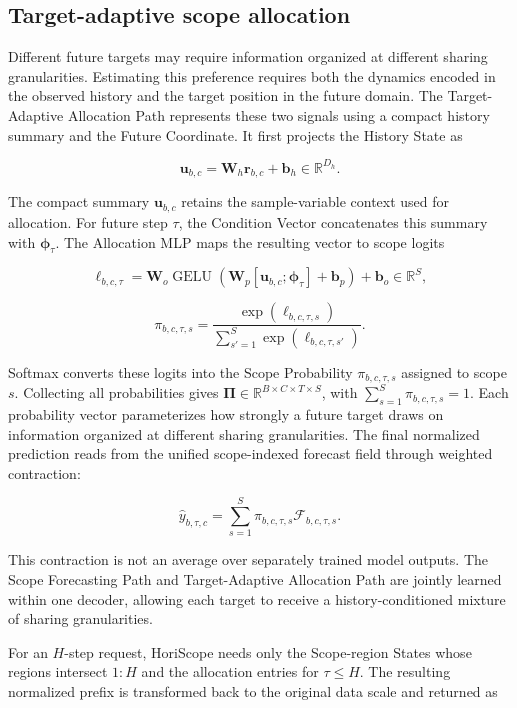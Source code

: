 \documentclass[final,3p,times]{elsarticle}
\begin{document}
\subsection{Target-adaptive scope allocation}


Different future targets may require information organized at different sharing granularities. Estimating this preference requires both the dynamics encoded in the observed history and the target position in the future domain. The Target-Adaptive Allocation Path represents these two signals using a compact history summary and the Future Coordinate. It first projects the History State as

\[
\mathbf u_{b,c}
=
\mathbf W_h\mathbf r_{b,c}
+
\mathbf b_h
\in\mathbb R^{D_h}.
\]


The compact summary $\mathbf u_{b,c}$ retains the sample-variable context used for allocation. For future step $\tau$, the Condition Vector concatenates this summary with $\boldsymbol\phi_\tau$. The Allocation MLP maps the resulting vector to scope logits

\[
\boldsymbol\ell_{b,c,\tau}
=
\mathbf W_o
\operatorname{GELU}\!\left(
\mathbf W_p
[\mathbf u_{b,c};\boldsymbol\phi_\tau]
+
\mathbf b_p
\right)
+
\mathbf b_o
\in\mathbb R^S,
\]


\[
\pi_{b,c,\tau,s}
=
\frac{
\exp(\ell_{b,c,\tau,s})
}{
\sum_{s'=1}^{S}
\exp(\ell_{b,c,\tau,s'})
}.
\]


Softmax converts these logits into the Scope Probability $\pi_{b,c,\tau,s}$ assigned to scope $s$. Collecting all probabilities gives $\boldsymbol\Pi\in\mathbb R^{B\times C\times T\times S}$, with $\sum_{s=1}^{S}\pi_{b,c,\tau,s}=1$. Each probability vector parameterizes how strongly a future target draws on information organized at different sharing granularities. The final normalized prediction reads from the unified scope-indexed forecast field through weighted contraction:

\[
\widehat y_{b,\tau,c}
=
\sum_{s=1}^{S}
\pi_{b,c,\tau,s}
\mathcal F_{b,c,\tau,s}.
\]


This contraction is not an average over separately trained model outputs. The Scope Forecasting Path and Target-Adaptive Allocation Path are jointly learned within one decoder, allowing each target to receive a history-conditioned mixture of sharing granularities.

For an $H$-step request, HoriScope needs only the Scope-region States whose regions intersect $1{:}H$ and the allocation entries for $\tau\leq H$. The resulting normalized prefix is transformed back to the original data scale and returned as
\end{document}
